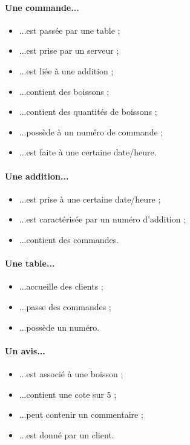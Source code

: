 \begin{minipage}[r]{0.5\textwidth}
  \paragraph{Une commande...}
	\begin{itemize}
		\item ...est passée par une table ;
		\item ...est prise par un serveur ;
		\item ...est liée à une addition ;
		\item ...contient des boissons ;		
		\item ...contient des quantités de boissons ;
		\item ...possède à un numéro de commande ;
		\item ...est faite à une certaine date/heure.
	\end{itemize}

	\paragraph{Une addition...}
	\begin{itemize}
		\item ...est prise à une certaine date/heure ;
		\item ...est caractérisée par un numéro d’addition ;
		\item ...contient des commandes.
	\end{itemize}
	
	\paragraph{Une table...}
	\begin{itemize}
		\item ...accueille des clients ;
		\item ...passe des commandes ;
		\item ...possède un numéro.
	\end{itemize}

	\paragraph{Un avis...}
	\begin{itemize}
		\item ...est associé à une boisson ;
		\item ...contient une cote sur 5 ;
		\item ...peut contenir un commentaire ;
		\item ...est donné par un client.
	\end{itemize}
\end{minipage}

